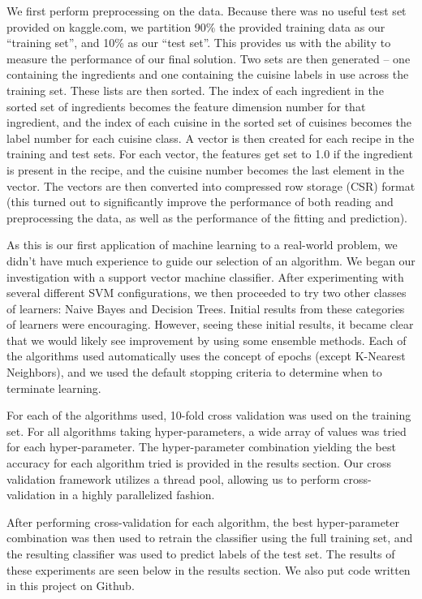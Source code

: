 \documentclass[11pt]{article}
\begin{document}
We first perform preprocessing on the data.  Because there was no
useful test set provided on kaggle.com, we partition 90\% the
provided training data as our ``training set'', and 10\% as our ``test
set''. This provides us with the ability to measure the performance of
our final solution.  Two sets are then generated -- one containing the
ingredients and one containing the cuisine labels in use across the
training set.  These lists are then sorted.  The index of each
ingredient in the sorted set of ingredients becomes the feature 
dimension number for that ingredient, and the index of each cuisine in
the sorted set of cuisines becomes the label number for each cuisine
class.  A vector is then created for each recipe in the training and
test sets.  For each vector, the features get set to 1.0 if the
ingredient is present in the recipe, and the cuisine number becomes
the last element in the vector.  The vectors are then converted into
compressed row storage (CSR) format (this turned out to significantly
improve the performance of both reading and preprocessing the data, as 
well as the performance of the fitting and prediction).

As this is our first application of machine learning to a real-world
problem, we didn't have much experience to guide our selection of an
algorithm.  We began our investigation with a support vector machine
classifier.  After experimenting with several different SVM
configurations, we then proceeded to try two other classes of
learners: Naive Bayes and Decision Trees.  Initial results from these
categories of learners were encouraging.  However, seeing these
initial results, it became clear that we would likely see improvement
by using some ensemble methods.  Each of the algorithms used
automatically uses the concept of epochs (except K-Nearest Neighbors),
and we used the default stopping criteria to determine when to
terminate learning.  

For each of the algorithms used, 10-fold cross validation was used on
the training set.  For all algorithms taking hyper-parameters, a wide
array of values was tried for each hyper-parameter.  The
hyper-parameter combination yielding the best accuracy for each
algorithm tried is provided in the results section.  Our cross
validation framework utilizes a thread pool, allowing us to perform
cross-validation in a highly parallelized fashion.

After performing cross-validation for each algorithm, the best
hyper-parameter combination was then used to retrain the classifier
using the full training set, and the resulting classifier was used
to predict labels of the test set.  The results of these experiments
are seen below in the results section. We also put code written in this project on Github\cite{repo}.
\end{document}
